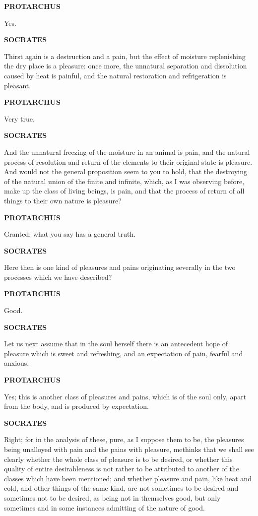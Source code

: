 \documentclass[11pt,letter]{article}
\begin{document}
\par \textbf{PROTARCHUS}
\par   Yes.

\par \textbf{SOCRATES}
\par   Thirst again is a destruction and a pain, but the effect of moisture replenishing the dry place is a pleasure:  once more, the unnatural separation and dissolution caused by heat is painful, and the natural restoration and refrigeration is pleasant.

\par \textbf{PROTARCHUS}
\par   Very true.

\par \textbf{SOCRATES}
\par   And the unnatural freezing of the moisture in an animal is pain, and the natural process of resolution and return of the elements to their original state is pleasure. And would not the general proposition seem to you to hold, that the destroying of the natural union of the finite and infinite, which, as I was observing before, make up the class of living beings, is pain, and that the process of return of all things to their own nature is pleasure?

\par \textbf{PROTARCHUS}
\par   Granted; what you say has a general truth.

\par \textbf{SOCRATES}
\par   Here then is one kind of pleasures and pains originating severally in the two processes which we have described?

\par \textbf{PROTARCHUS}
\par   Good.

\par \textbf{SOCRATES}
\par   Let us next assume that in the soul herself there is an antecedent hope of pleasure which is sweet and refreshing, and an expectation of pain, fearful and anxious.

\par \textbf{PROTARCHUS}
\par   Yes; this is another class of pleasures and pains, which is of the soul only, apart from the body, and is produced by expectation.

\par \textbf{SOCRATES}
\par   Right; for in the analysis of these, pure, as I suppose them to be, the pleasures being unalloyed with pain and the pains with pleasure, methinks that we shall see clearly whether the whole class of pleasure is to be desired, or whether this quality of entire desirableness is not rather to be attributed to another of the classes which have been mentioned; and whether pleasure and pain, like heat and cold, and other things of the same kind, are not sometimes to be desired and sometimes not to be desired, as being not in themselves good, but only sometimes and in some instances admitting of the nature of good.
\end{document}
